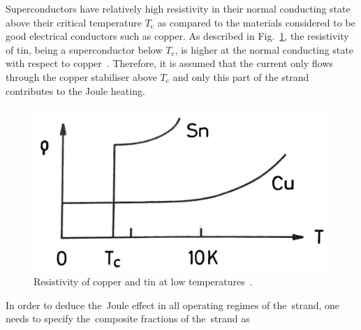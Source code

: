 Superconductors have relatively high resistivity in their normal conducting state above their critical temperature $T_\text{c}$ as compared to the materials considered to be good electrical conductors such as copper. As described in Fig.~\ref{fig:resitivity_tin_copper}, the resistivity of tin, being a superconductor below $T_\text{c}$, is higher at the normal conducting state with respect to copper~\cite[p.~1-6]{superconducting_accelerator_magnets}. Therefore, it is assumed that the current only flows through the copper stabiliser above $T_\text{c}$ and only this part of the strand contributes to the Joule heating. 

\begin{figure}[H]
    \centering
    \includegraphics[width=0.35\linewidth]{sections/introduction/figures/sn_cu_resistivity.png}
    \caption{Resistivity of copper and tin at low temperatures~\cite{superconducting_accelerator_magnets}.}
    \label{fig:resitivity_tin_copper}
\end{figure} 

In order to deduce the~Joule effect in all operating regimes of the~strand, one needs to specify the~composite fractions of the~strand as 

